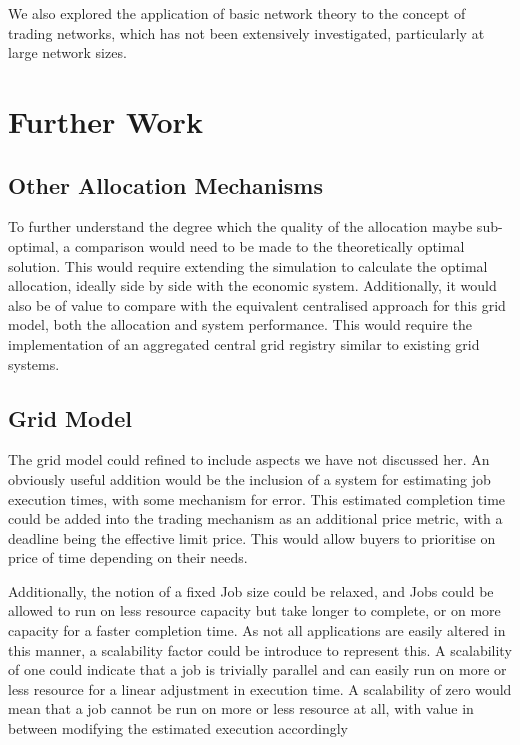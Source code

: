 We also explored the application of basic network theory to the concept of
trading networks, which has not been extensively investigated, particularly at
large network sizes.

\section{Further Work}
\label{SEC:CONC:FW}

\subsection{Other Allocation Mechanisms}

To further understand the degree which the quality of the allocation maybe
sub-optimal, a comparison would need to be made to the theoretically optimal
solution. This would require extending the simulation to calculate the optimal
allocation, ideally side by side with the economic system. Additionally, it would
also be of value to compare with the equivalent centralised approach for this
grid model, both the allocation and system performance. This would require the
implementation of an aggregated central grid registry similar to existing grid
systems.

\subsection{Grid Model}

The grid model could refined  to include aspects we have not discussed her. An
obviously useful addition would be the inclusion of a system for estimating job
execution times, with some mechanism for error. This estimated completion time
could be added into the trading mechanism as an additional price metric, with a
deadline being the effective limit price. This would allow buyers to prioritise
on price of time depending on their needs.

Additionally, the notion of a fixed Job size could be relaxed, and Jobs could
be allowed to run on less resource capacity but take longer to complete, or on
more capacity for a faster completion time. As not all applications are easily
altered in this manner, a scalability factor could be introduce to represent
this. A scalability of one could indicate that a job is trivially parallel and
can easily run on more or less resource for a linear adjustment in execution
time. A scalability of zero would mean that a job cannot be run on more or less
resource at all, with value in between modifying the estimated execution accordingly


